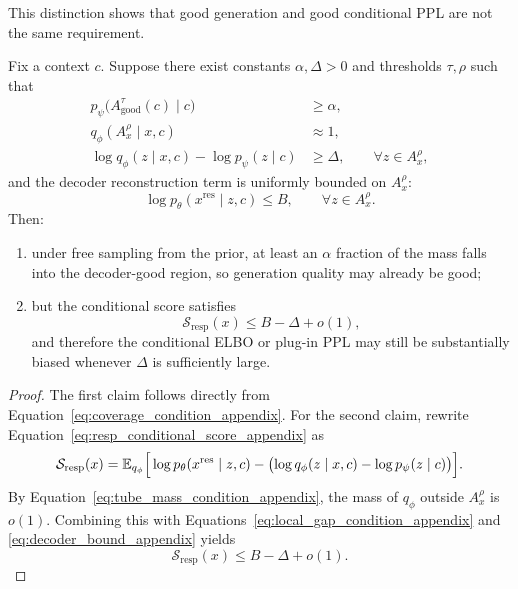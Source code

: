 This distinction shows that good generation and good conditional PPL are not the same requirement.

\begin{proposition}
\label{prop:good_gen_bad_score_appendix}
Fix a context $c$. Suppose there exist constants $\alpha,\Delta>0$ and thresholds $\tau,\rho$ such that
\begin{align}
p_{\psi}\bigl(A_{\mathrm{good}}^{\tau}(c)\mid c\bigr) &\ge \alpha,
\label{eq:coverage_condition_appendix}
\\
q_{\phi}(A_x^{\rho}\mid x,c) &\approx 1,
\label{eq:tube_mass_condition_appendix}
\\
\log q_{\phi}(z\mid x,c)-\log p_{\psi}(z\mid c) &\ge \Delta,
\qquad \forall z\in A_x^{\rho},
\label{eq:local_gap_condition_appendix}
\end{align}
and the decoder reconstruction term is uniformly bounded on $A_x^{\rho}$:
\begin{equation}
\log p_{\theta}(x^{\mathrm{res}}\mid z,c)\le B,
\qquad \forall z\in A_x^{\rho}.
\label{eq:decoder_bound_appendix}
\end{equation}
Then:
\begin{enumerate}
    \item under free sampling from the prior, at least an $\alpha$ fraction of the mass falls into the decoder-good region, so generation quality may already be good;
    \item but the conditional score satisfies
    \begin{equation}
    \mathcal S_{\mathrm{resp}}(x)\le B-\Delta+o(1),
    \label{eq:conditional_score_upper_bound_appendix}
    \end{equation}
    and therefore the conditional ELBO or plug-in PPL may still be substantially biased whenever $\Delta$ is sufficiently large.
\end{enumerate}
\end{proposition}

\begin{proof}
The first claim follows directly from Equation~\eqref{eq:coverage_condition_appendix}. For the second claim, rewrite Equation~\eqref{eq:resp_conditional_score_appendix} as
\[
\mathcal S_{\mathrm{resp}}(x)
=
\mathbb{E}_{q_{\phi}}
\Big[
\log p_{\theta}(x^{\mathrm{res}}\mid z,c)
-\bigl(\log q_{\phi}(z\mid x,c)-\log p_{\psi}(z\mid c)\bigr)
\Big].
\]
By Equation~\eqref{eq:tube_mass_condition_appendix}, the mass of $q_{\phi}$ outside $A_x^{\rho}$ is $o(1)$. Combining this with Equations~\eqref{eq:local_gap_condition_appendix} and \eqref{eq:decoder_bound_appendix} yields
\[
\mathcal S_{\mathrm{resp}}(x)\le B-\Delta+o(1).
\]
\end{proof}


